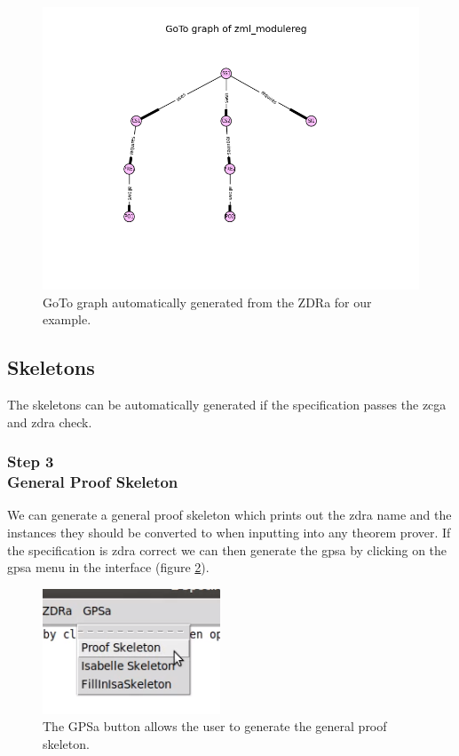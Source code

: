 \begin{figure}[H]
\centering
\includegraphics[scale=0.7]{Figures/fullexample/goto_fullexample.jpg}
\caption{GoTo graph automatically generated from the ZDRa for our example. \label{fig:gotoexample}}
\end{figure}

\subsection{Skeletons}

The skeletons can be automatically generated if the specification passes the
\gls{zcga} and \gls{zdra} check.

\subsubsection{Step 3\\General Proof Skeleton}

We can generate a general proof skeleton which prints out the \gls{zdra} name
and the instances they should be converted to when inputting into any theorem
prover. If the specification is \gls{zdra} correct we can then generate the
\gls{gpsa} by clicking on the \gls{gpsa} menu in the interface (figure
\ref{fig:gpsabutton}).

\begin{figure}[H]
\centering
\includegraphics[scale=1]{Figures/fullexample/proofskelbutton.png}
\caption{The GPSa button allows the user to generate the general proof skeleton. \label{fig:gpsabutton}}
\end{figure}

